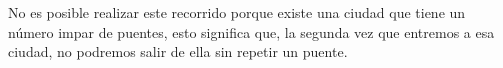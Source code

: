 No es posible realizar este recorrido porque existe una ciudad que tiene un número impar de puentes, esto significa que, la segunda vez que entremos a esa ciudad, no podremos salir de ella sin repetir un puente.